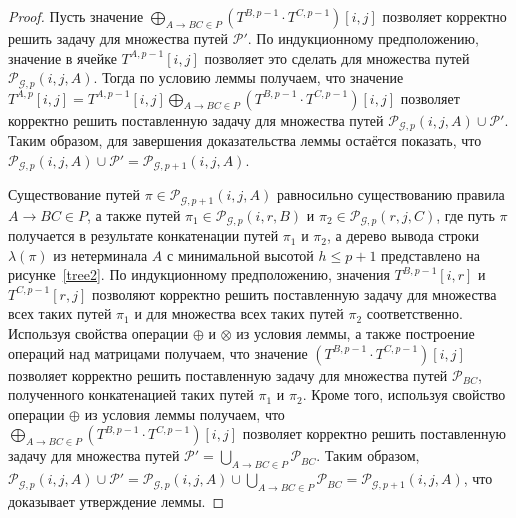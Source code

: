\begin{proof}
	Пусть значение $\bigoplus_{A \to B C \in P} (T^{B, p - 1} \cdot T^{C, p - 1})[i, j]$ позволяет корректно решить задачу для множества путей $\mathcal{P}'$. По индукционному предположению, значение в ячейке $T^{A, p - 1}[i, j]$ позволяет это сделать для множества путей $\mathcal{P}_{\mathcal{G}, p}(i, j, A)$. Тогда по условию леммы получаем, что значение $T^{A, p}[i, j] = T^{A, p - 1}[i, j] \bigoplus_{A \to B C \in P} (T^{B, p - 1} \cdot T^{C, p - 1})[i, j]$ позволяет корректно решить поставленную задачу для множества путей $\mathcal{P}_{\mathcal{G}, p}(i, j, A) \cup \mathcal{P}'$. Таким образом, для завершения доказательства леммы остаётся показать, что $\mathcal{P}_{\mathcal{G}, p}(i, j, A) \cup \mathcal{P}' = \mathcal{P}_{\mathcal{G}, p + 1}(i, j, A)$.
	
	Существование путей $\pi \in \mathcal{P}_{\mathcal{G}, p + 1}(i, j, A)$ равносильно существованию правила $A \to B C \in P$, а также путей $\pi_1 \in \mathcal{P}_{\mathcal{G}, p}(i, r, B)$  и $\pi_2 \in \mathcal{P}_{\mathcal{G}, p}(r, j, C)$, где путь $\pi$ получается в результате конкатенации путей $\pi_1$ и $\pi_2$, а дерево вывода строки $\lambda(\pi)$ из нетерминала $A$ с минимальной высотой $h \leq p + 1$ представлено на рисунке~\ref{tree2}. По индукционному предположению, значения $T^{B, p - 1}[i, r]$ и $T^{C, p - 1}[r, j]$ позволяют корректно решить поставленную задачу для множества всех таких путей $\pi_1$ и для множества всех таких путей $\pi_2$ соответственно. Используя свойства операции $\oplus$ и $\otimes$ из условия леммы, а также построение операций над матрицами получаем, что значение $(T^{B, p - 1} \cdot T^{C, p - 1})[i, j]$ позволяет корректно решить поставленную задачу для множества путей $\mathcal{P}_{\textit{BC}}$, полученного конкатенацией таких путей $\pi_1$ и $\pi_2$. Кроме того, используя свойство операции $\oplus$ из условия леммы получаем, что $\bigoplus_{A \to B C \in P} (T^{B, p - 1} \cdot T^{C, p - 1})[i, j]$ позволяет корректно решить поставленную задачу для множества путей $\mathcal{P}' = \bigcup_{A \to B C \in P} \mathcal{P}_{\textit{BC}}$. Таким образом, $\mathcal{P}_{\mathcal{G}, p}(i, j, A) \cup \mathcal{P}' = \mathcal{P}_{\mathcal{G}, p}(i, j, A) \cup \bigcup_{A \to B C \in P} \mathcal{P}_{\textit{BC}} = \mathcal{P}_{\mathcal{G}, p + 1}(i, j, A)$, что доказывает утверждение леммы.
	

\end{proof}
